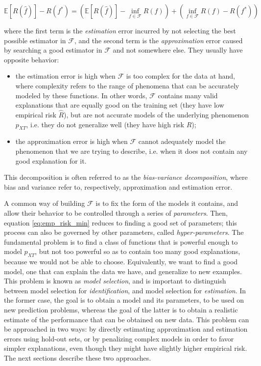 \documentclass[a4paper,11pt]{kth-mag}
\begin{document}
\begin{equation}
\mathbb{E}[R(\hat{f})]-R(f^*)=
\left(\mathbb{E}[R(\hat{f})]-\inf_{f\in\mathcal{F}} R(f)\right)
+\left(\inf_{f\in\mathcal{F}} R(f)-R(f^*)\right)
\end{equation}

\noindent where the first term is the \emph{estimation} error incurred by not selecting the best possible estimator in $\mathcal{F}$, and the second term is the \emph{approximation} error caused by searching a good estimator in $\mathcal{F}$ and not somewhere else. They usually have opposite behavior:

\begin{itemize}
\item the estimation error is high when $\mathcal{F}$ is too complex for the data at hand, where complexity refers to the range of phenomena that can be accurately modeled by these functions. In other words, $\mathcal{F}$ contains many valid explanations that are equally good on the training set (they have low empirical risk $\hat{R}$), but are not accurate models of the underlying phenomenon $p_{XT}$, i.e. they do not generalize well (they have high risk $R$);
\item the approximation error is high when $\mathcal{F}$ cannot adequately model the phenomenon that we are trying to describe, i.e. when it does not contain any good explanation for it.
\end{itemize}

This decomposition is often referred to as the \emph{bias-variance decomposition}, where bias and variance refer to, respectively, approximation and estimation error.

A common way of building $\mathcal{F}$ is to fix the form of the models it contains, and allow their behavior to be controlled through a series of \emph{parameters}. Then, equation \ref{eq:emp_risk_min} reduces to finding a good set of parameters; this process can also be governed by other parameters, called \emph{hyper-parameters}. The fundamental problem is to find a class of functions that is powerful enough to model $p_{XT}$, but not too powerful so as to contain too many good explanations, because we would not be able to choose. Equivalently, we want to find a good model, one that can explain the data we have, and generalize to new examples. This problem is known as \emph{model selection}, and is important to distinguish between model selection for \emph{identification}, and model selection for \emph{estimation}. In the former case, the goal is to obtain a model and its parameters, to be used on new prediction problems, whereas the goal of the latter is to obtain a realistic estimate of the performance that can be obtained on new data. This problem can be approached in two ways: by directly estimating approximation and estimation errors using hold-out sets, or by penalizing complex models in order to favor simpler explanations, even though they might have slightly higher empirical risk. The next sections describe these two approaches.
\end{document}
